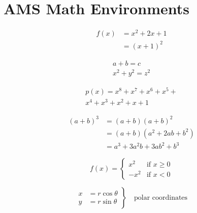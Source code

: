 \documentclass{article}
\begin{document}
\section{AMS Math Environments}

\begin{align}
f(x) &= x^2 + 2x + 1 \\
     &= (x + 1)^2
\end{align}

\begin{gather}
a + b = c \\
x^2 + y^2 = z^2
\end{gather}

\begin{multline}
p(x) = x^8 + x^7 + x^6 + x^5 + \\
       x^4 + x^3 + x^2 + x + 1
\end{multline}

\begin{equation}
\begin{split}
(a + b)^3 &= (a + b)(a + b)^2 \\
          &= (a + b)(a^2 + 2ab + b^2) \\
          &= a^3 + 3a^2b + 3ab^2 + b^3
\end{split}
\end{equation}

\begin{equation}
f(x) = \begin{cases}
x^2 & \text{if } x \geq 0 \\
-x^2 & \text{if } x < 0
\end{cases}
\end{equation}

\begin{equation}
\left.
\begin{aligned}
x &= r\cos\theta \\
y &= r\sin\theta
\end{aligned}
\right\}
\quad \text{polar coordinates}
\end{equation}
\end{document}
